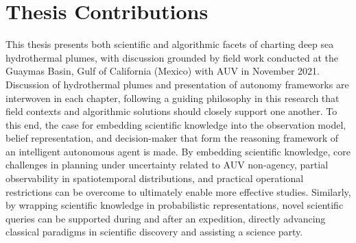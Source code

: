 \section{Thesis Contributions}
\label{sec:intro_contributions}
This thesis presents both scientific and algorithmic facets of charting deep sea hydrothermal plumes, with discussion grounded by field work conducted at the Guaymas Basin, Gulf of California (Mexico) with AUV \Sentry in November 2021.
Discussion of hydrothermal plumes and presentation of autonomy frameworks are interwoven in each chapter, following a guiding philosophy in this research that field contexts and algorithmic solutions should closely support one another.
To this end, the case for embedding scientific knowledge into the observation model, belief representation, and decision-maker that form the reasoning framework of an intelligent autonomous agent is made.
By embedding scientific knowledge, core challenges in planning under uncertainty related to AUV non-agency, partial observability in spatiotemporal distributions, and practical operational restrictions can be overcome to ultimately enable more effective studies. 
Similarly, by wrapping scientific knowledge in probabilistic representations, novel scientific queries can be supported during and after an expedition, directly advancing classical paradigms in scientific discovery and assisting a science party.

